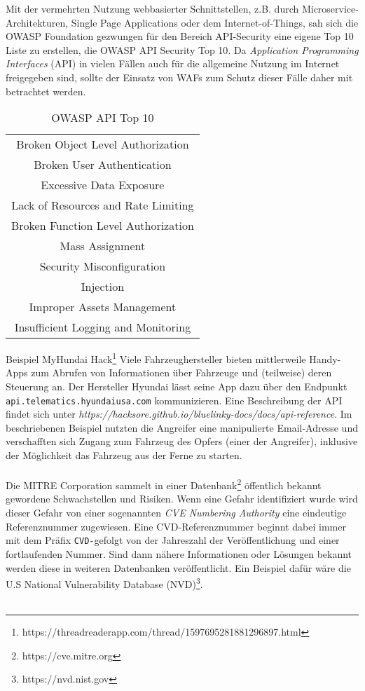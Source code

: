 Mit der vermehrten Nutzung webbasierter Schnittstellen, z.B. durch Microservice-Architekturen, Single Page Applications oder dem Internet-of-Things, sah sich die OWASP Foundation gezwungen für den Bereich API-Security eine eigene Top 10 Liste zu erstellen, die OWASP API Security Top 10\cite{owaspapi10}. Da \emph{Application Programming Interfaces} (API) in vielen Fällen auch für die allgemeine Nutzung im Internet freigegeben sind, sollte der Einsatz von WAFs zum Schutz dieser Fälle daher mit betrachtet werden. 

\begin{table}[ht]
    \centering
    \begin{tabular}{|c|}
    \hline
         Broken Object Level Authorization   \\
         Broken User Authentication  \\
         Excessive Data Exposure  \\
         Lack of Resources and Rate Limiting  \\
         Broken Function Level Authorization  \\
         Mass Assignment  \\
         Security Misconfiguration  \\
         Injection  \\
         Improper Assets Management  \\
         Insufficient Logging and Monitoring  \\
         \hline
    \end{tabular}
    \caption{OWASP API Top 10}
    \label{tab:owaspapitop10}
\end{table}

\textcolor{bhtGray}{ Beispiel MyHundai Hack\footnote{https://threadreaderapp.com/thread/1597695281881296897.html}} Viele Fahrzeughersteller bieten mittlerweile Handy-Apps zum Abrufen von Informationen über Fahrzeuge und (teilweise) deren Steuerung an. Der Hersteller Hyundai lässt seine App dazu über den Endpunkt \texttt{api.telematics.hyundaiusa.com} kommunizieren. Eine Beschreibung der API findet sich unter \emph{https://hacksore.github.io/bluelinky-docs/docs/api-reference}. Im beschriebenen Beispiel nutzten die Angreifer eine manipulierte Email-Adresse und verschafften sich Zugang zum Fahrzeug des Opfers (einer der Angreifer), inklusive der Möglichkeit das Fahrzeug aus der Ferne zu starten. \\\\

Die MITRE Corporation sammelt in einer Datenbank\footnote{https://cve.mitre.org} öffentlich bekannt gewordene Schwachstellen und Risiken. Wenn eine Gefahr identifiziert wurde wird dieser Gefahr von einer sogenannten \emph{CVE Numbering Authority} eine eindeutige Referenznummer zugewiesen. Eine CVD-Referenznummer beginnt dabei immer mit dem Präfix \glqq\texttt{CVD-}\grqq gefolgt von der Jahreszahl der Veröffentlichung und einer fortlaufenden Nummer. Sind dann nähere Informationen oder Lösungen bekannt werden diese in weiteren Datenbanken veröffentlicht. Ein Beispiel dafür wäre die U.S National Vulnerability Database (NVD)\footnote{https://nvd.nist.gov}.\\\\

